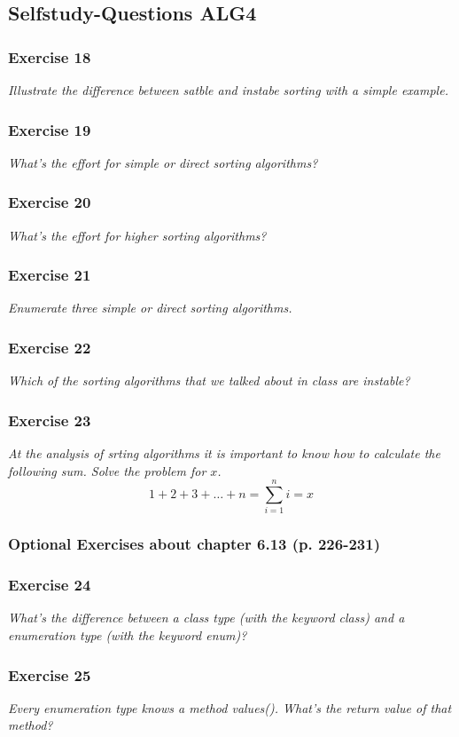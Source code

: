 \subsection{Selfstudy-Questions ALG4}

\subsubsection*{Exercise 18}
\textit{Illustrate the difference between satble and instabe sorting with a 
simple example.} \\

\subsubsection*{Exercise 19}
\textit{What's the effort for simple or direct sorting algorithms?} \\

\subsubsection*{Exercise 20}
\textit{What's the effort for higher sorting algorithms?} \\

\subsubsection*{Exercise 21}
\textit{Enumerate three simple or direct sorting algorithms.} \\

\subsubsection*{Exercise 22}
\textit{Which of the sorting algorithms that we talked about in class 
are instable?} \\

\subsubsection*{Exercise 23}
\textit{At the analysis of srting algorithms it is important to know how to
calculate the following sum. Solve the problem for $x$.} \\
\[ 1 + 2 + 3 + \dots + n = \sum_{i=1}^{n} i = x \]

\subsubsection{Optional Exercises about chapter 6.13 (p. 226-231)}

\subsubsection*{Exercise 24}
\textit{What's the difference between a class type (with the keyword class)
and a enumeration type (with the keyword enum)?} \\

\subsubsection*{Exercise 25}
\textit{Every enumeration type knows a method values(). What's the return
value of that method?} \\

